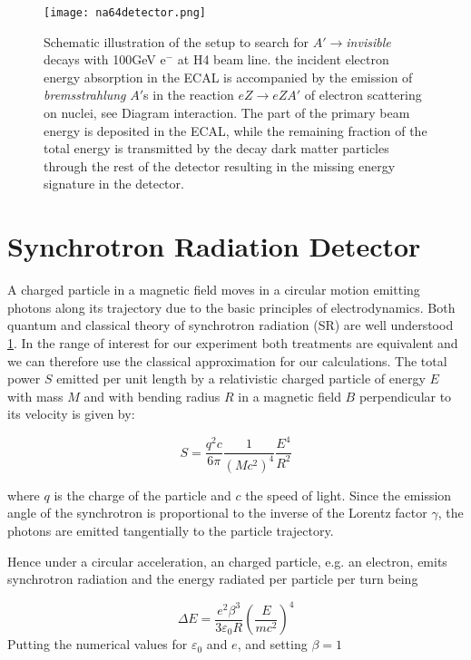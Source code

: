 \begin{figure}[ht]
		\hspace*{\fill}
		\centering
		\texttt{[image: na64detector.png]}
		\caption{Schematic illustration of the setup to search for $A'\rightarrow${\it invisible} decays with 100GeV e$^-$
		at H4 beam line. the incident electron energy absorption in the ECAL is accompanied by the emission of
		{\it bremsstrahlung} $A'$s in the reaction $eZ\rightarrow eZA'$ of electron scattering on nuclei, see Diagram
		interaction. The part of the primary beam energy is deposited in the ECAL, while the remaining fraction of the total
		energy is transmitted by the decay dark matter particles through the rest of the detector resulting in the missing
		energy signature in the detector.}\label{fig:na64detector}
\end{figure}

\section{Synchrotron Radiation Detector}


A charged particle in a magnetic field moves in a circular motion emitting photons along its trajectory due to the basic
principles of electrodynamics. Both quantum and classical theory of synchrotron radiation (SR) are well understood
\ref{}. In the range of interest for our experiment both treatments are equivalent and we can therefore use the
classical approximation for our calculations. The total power $S$ emitted per unit length by a relativistic charged
particle of energy $E$ with mass $M$ and with bending radius $R$ in a magnetic field $B$ perpendicular to its velocity
is given by:


\begin{equation}
S = \frac{q^2c}{6\pi}\frac{1}{(Mc^2)^4}\frac{E^4}{R^2}
\end{equation}

where $q$ is the charge of the particle and $c$ the speed of light. Since the emission angle of the synchrotron is
proportional to the inverse of the Lorentz factor $\gamma$, the photons are emitted tangentially to the particle
trajectory.\par

Hence under a circular acceleration, an charged particle, e.g. an electron, emits synchrotron radiation and the energy radiated per
particle per turn being

\begin{equation}
\Delta E = \frac{e^2\beta^3}{3\varepsilon_0 R}\left (\frac{E}{mc^2}\right )^4
\end{equation}
Putting the numerical values for $\varepsilon_0$ and $e$, and setting $\beta=1$

